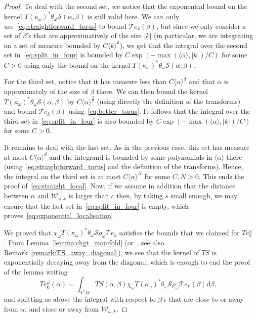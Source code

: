 \documentclass[AHL,Unicode,longabstracts,published]{cedram}
\newcommand{\brac}[1]{\langle #1 \rangle}
\newcommand{\clT}{\mathcal{T}}
\newcommand{\clS}{\mathcal{S}}
\newcommand{\clW}{\mathcal{W}}
\newcommand{\rmd}{\mathrm{d}}
\begin{document}
\begin{proof}
To deal with the second set, we notice that the exponential bound on the kernel $T(\kappa_\omega)^* \theta_\omega \clS(\alpha,\beta)$ is still valid here. We can only use~\eqref{eq:straightforward_torus} to bound $\clT e_k(\beta)$, but since we only consider a set of $\beta$'s that are approximatively of the size $|k|$ (in particular, we are integrating on a set of measure bounded by $C \brac{k}^d$), we get that the integral over the second set in~\eqref{eq:split_in_four} is bounded by $C \exp(- \max(\brac{\alpha},|k|)/C)$ for some $C > 0$ using only the bound on the kernel $T(\kappa_\omega)^* \theta_\omega \clS(\alpha,\beta)$.

For the third set, notice that it has measure less than $C \brac{\alpha}^d$ and that $\alpha$ is approximately of the size of $\beta$ there. We can then bound the kernel $T(\kappa_\omega)^* \theta_\omega \clS(\alpha,\beta)$ by $C \brac{\alpha}^{\frac{d}{2}}$ (using directly the definition of the transforms) and bound $\clT e_k(\beta)$ using~\eqref{eq:better_torus}. It follows that the integral over the third set in~\eqref{eq:split_in_four} is also bounded by $C \exp(- \max(\brac{\alpha},|k|)/C)$ for some $C > 0$.

It remains to deal with the last set. As in the previous case, this set has measure at most $C \brac{\alpha}^d$ and the integrand is bounded by some polynomials in $\brac{\alpha}$ there (using~\eqref{eq:straightforward_torus} and the definition of the transforms). Hence, the integral on the third set is at most $C \brac{\alpha}^N$ for some $C,N > 0$. This ends the proof of~\eqref{eq:straight_local}. Now, if we assume in addition that the distance between $\alpha$ and $\clW_{\omega,k}$ is larger than $c$ then, by taking $s$ small enough, we may ensure that the last set in~\eqref{eq:split_in_four} is empty, which proves~\eqref{eq:exponential_localisation}.

We proved that $\chi_\omega T(\kappa_\omega)^* \theta_\omega \clS\rho_\omega \clT e_k$ satisfies the bounds that we claimed for $T e_k^\omega$. From Lemma~\ref{lemma:chgt_manifold} (or~\cite[Lemma~2.9]{BJ20}, see also Remark~\ref{remark:TS_away_diagonal}), we see that the kernel of $TS$ is exponentially decaying away from the diagonal, which is enough to end the proof of the lemma writing
\begin{equation*}
T e_k^\omega (\alpha) = \int_{T^* M} TS(\alpha,\beta)\chi_\omega T(\kappa_\omega)^* \theta_\omega \clS\rho_\omega \clT e_k(\beta) \rmd \beta,
\end{equation*}
and splitting as above the integral with respect to $\beta$'s that are close to or away from $\alpha$, and close or away from $\clW_{\omega,k}$.
\end{proof}
\end{document}
